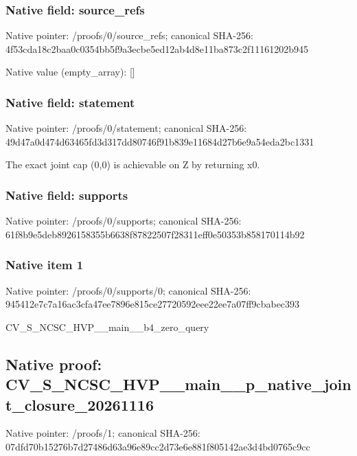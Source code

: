 \documentclass[10pt,a4paper]{article}
\begin{document}
\subsubsection{Native field: source\_\allowbreak{}refs}
Native pointer: /proofs/0/source\_\allowbreak{}refs; canonical SHA-256: 4f53cda18c2baa0c0354bb5f9a3ecbe5ed12ab4d8e11ba873c2f11161202b945

Native value (empty\_\allowbreak{}array): []

\subsubsection{Native field: statement}
Native pointer: /proofs/0/statement; canonical SHA-256: 49d47a0d474d63465fd3d317dd80746f91b839e11684d27b6e9a54eda2bc1331

\begingroup\raggedright\sloppy The exact joint cap (0,\allowbreak{}0) is achievable on Z by returning x0.\par\endgroup

\subsubsection{Native field: supports}
Native pointer: /proofs/0/supports; canonical SHA-256: 61f8b9e5deb8926158355b6638f87822507f28311eff0e50353b858170114b92

\subsubsection{Native item 1}
Native pointer: /proofs/0/supports/0; canonical SHA-256: 945412e7c7a16ac3cfa47ee7896e815ce27720592eee22ee7a07ff9cbabec393

\begingroup\raggedright\sloppy CV\_\allowbreak{}S\_\allowbreak{}NCSC\_\allowbreak{}HVP\_\allowbreak{}\_\allowbreak{}main\_\allowbreak{}\_\allowbreak{}b4\_\allowbreak{}zero\_\allowbreak{}query\par\endgroup

\subsection{Native proof: CV\_\allowbreak{}S\_\allowbreak{}NCSC\_\allowbreak{}HVP\_\allowbreak{}\_\allowbreak{}main\_\allowbreak{}\_\allowbreak{}p\_\allowbreak{}native\_\allowbreak{}joint\_\allowbreak{}closure\_\allowbreak{}20261116}
Native pointer: /proofs/1; canonical SHA-256: 07dfd70b15276b7d27486d63a96e89cc2d73e6e881f805142ae3d4bd0765c9cc
\end{document}
